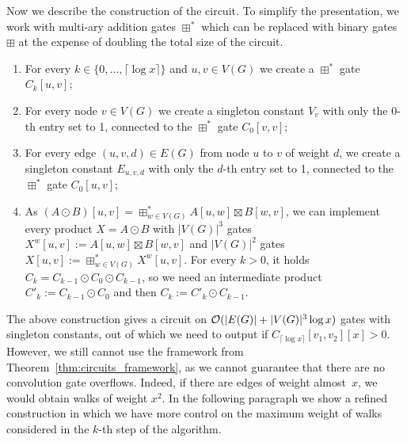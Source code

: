 Now we describe the construction of the circuit.
To simplify the presentation, we work with multi-ary addition gates $\boxplus^*$ which can be replaced with binary gates $\boxplus$ at the expense of doubling the total size of the circuit.

\begin{enumerate}
 \item For every $k\in \{0,\ldots, \lceil \log x \rceil\}$ and $u,v\in V(G)$ we create a $\boxplus^*$ gate $C_k[u,v]$;
 \item For every node $v\in V(G)$ we create a singleton constant $V_v$ with only the $0$-th entry set to 1, connected to the $\boxplus^*$ gate $C_0[v,v]$;
 \item For every edge $(u,v,d)\in E(G)$ from node $u$ to $v$ of weight $d$, we create a singleton constant $E_{u,v,d}$ with only the $d$-th entry set to 1, connected to the $\boxplus^*$ gate $C_0[u,v]$;
 \item As $(A\odot B)[u,v]=\boxplus^*_{w\in V(G)} A[u,w] \boxtimes B[w,v]$, we can implement every product $X=A\odot B$ with $|V(G)|^3$ gates $X^w[u,v]:= A[u,w] \boxtimes B[w,v]$ and $|V(G)|^2$ gates $X[u,v]:=\boxplus^*_{w\in V(G)} X^w[u,v]$.
 For every $k>0$, it holds~$C_{k}=C_{k-1} \odot C_0 \odot C_{k-1}$, so we need an intermediate product $C'_{k}:=C_{k-1} \odot C_0$ and then $C_{k}:= C'_k \odot C_{k-1}$.
\end{enumerate}

The above construction gives a circuit on $\mathcal{O}(|E(G)|+|V(G)|^3\log x)$ gates with singleton constants, out of which we need to output if $C_{\lceil \log x \rceil}[v_1,v_2][x]>0$.
However, we still cannot use the framework from Theorem~\ref{thm:circuits_framework}, as we cannot guarantee that there are no convolution gate overflows.
Indeed, if there are edges of weight almost~$x$, we would obtain walks of weight $x^2$.
In the following paragraph we show a refined construction in which we have more control on the maximum weight of walks considered in the $k$-th step of the algorithm.

